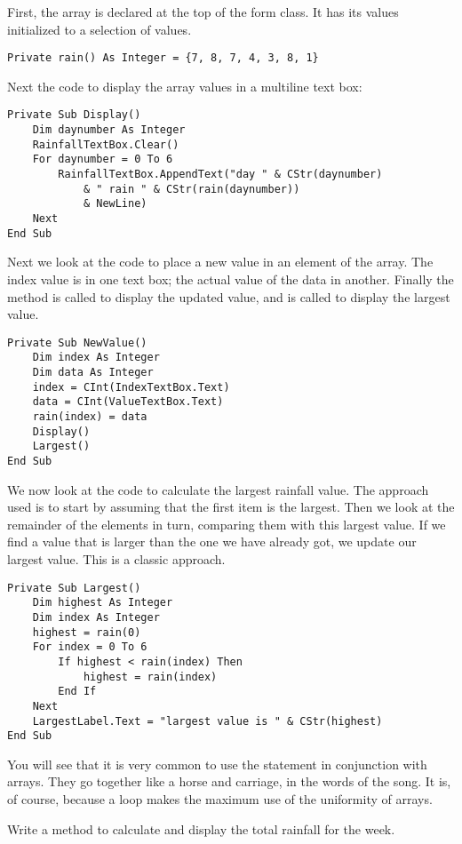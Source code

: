 		
		First, the array is declared at the top of the form class. It has its values initialized to a selection of values.
		\begin{lstlisting}
Private rain() As Integer = {7, 8, 7, 4, 3, 8, 1}
		\end{lstlisting}
Next the code to display the array values in a multiline text box:
		\begin{lstlisting}
Private Sub Display()
	Dim daynumber As Integer
	RainfallTextBox.Clear()
	For daynumber = 0 To 6
		RainfallTextBox.AppendText("day " & CStr(daynumber)
			& " rain " & CStr(rain(daynumber))
			& NewLine)
	Next
End Sub
		\end{lstlisting}
		Next we look at the code to place a new value in an element of the array. The index value is in one text box; the actual value of the data in another. Finally the method  is called to display the updated value, and  is called to display the largest value.
		\begin{lstlisting}
Private Sub NewValue()
	Dim index As Integer
	Dim data As Integer
	index = CInt(IndexTextBox.Text)
	data = CInt(ValueTextBox.Text)
	rain(index) = data
	Display()
	Largest()
End Sub
		\end{lstlisting}
		We now look at the code to calculate the largest rainfall value. The approach used is to start by assuming that the first item is the largest. Then we look at the remainder of the elements in turn, comparing them with this largest value. If we find a value that is larger than the one we have already got, we update our largest value. This is a classic approach.
		\begin{lstlisting}
Private Sub Largest()
	Dim highest As Integer
	Dim index As Integer
	highest = rain(0)
	For index = 0 To 6
		If highest < rain(index) Then
			highest = rain(index)
		End If
	Next
	LargestLabel.Text = "largest value is " & CStr(highest)
End Sub
		\end{lstlisting}
		You will see that it is very common to use the  statement in conjunction with arrays. They go together like a horse and carriage, in the words of the song. It is, of course, because a  loop makes the maximum use of the uniformity of arrays.

		\begin{stqb}
			\begin{STQ}
			\item Write a method to calculate and display the total rainfall for the week.
			\end{STQ}
		\end{stqb}



